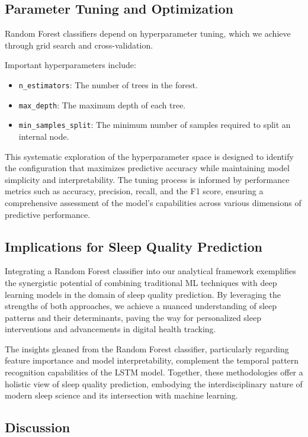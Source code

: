 \documentclass[10pt]{extarticle}
\begin{document}
\subsection{Parameter Tuning and Optimization}
Random Forest classifiers depend on hyperparameter tuning, which we achieve through grid search and cross-validation.

Important hyperparameters include:

\begin{itemize}
    \item \texttt{n\_estimators}: The number of trees in the forest.
    \item \texttt{max\_depth}: The maximum depth of each tree.
    \item \texttt{min\_samples\_split}: The minimum number of samples required to split an internal node.
\end{itemize}

This systematic exploration of the hyperparameter space is designed to identify the configuration that maximizes predictive accuracy while maintaining model simplicity and interpretability. The tuning process is informed by performance metrics such as accuracy, precision, recall, and the F1 score, ensuring a comprehensive assessment of the model's capabilities across various dimensions of predictive performance.

\subsection{Implications for Sleep Quality Prediction}

Integrating a Random Forest classifier into our analytical framework exemplifies the synergistic potential of combining traditional ML techniques with deep learning models in the domain of sleep quality prediction. By leveraging the strengths of both approaches, we achieve a nuanced understanding of sleep patterns and their determinants, paving the way for personalized sleep interventions and advancements in digital health tracking.

The insights gleaned from the Random Forest classifier, particularly regarding feature importance and model interpretability, complement the temporal pattern recognition capabilities of the LSTM model. Together, these methodologies offer a holistic view of sleep quality prediction, embodying the interdisciplinary nature of modern sleep science and its intersection with machine learning.

\subsection{Discussion}
\end{document}
